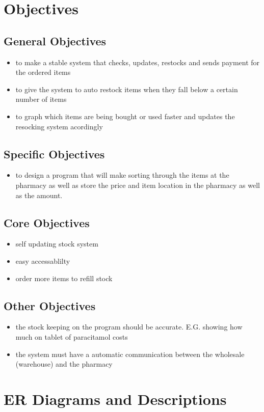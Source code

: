 \section{Objectives}
\subsection{General Objectives}
\begin{itemize}
	\item to make a stable system that checks, updates, restocks and sends payment for the ordered items
	\item to give the system to auto restock items when they fall below a certain number of items
	\item to graph which items are being bought or used faster and updates the resocking system acordingly 
\end{itemize}
\subsection{Specific Objectives}
\begin{itemize}
	\item to design a program that will make sorting through the items at the pharmacy as well as store the price and item location in the pharmacy as well as the amount.
\end{itemize}
\subsection{Core Objectives}
\begin{itemize}
\item self updating stock system
\item easy accessablilty
\item order more items to refill stock
\end{itemize}
\subsection{Other Objectives}
\begin{itemize}
    \item the stock keeping on the program should be accurate. E.G. showing how much on tablet of paracitamol costs
    \item the system must have a automatic communication between the wholesale (warehouse) and the pharmacy
\end{itemize}
\section{ER Diagrams and Descriptions}

